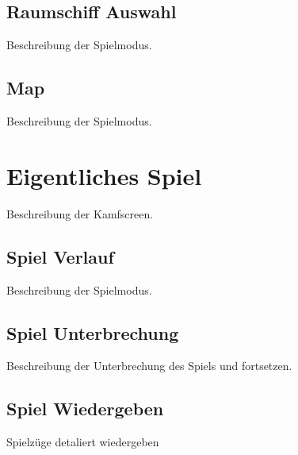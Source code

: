 \documentclass[fontsize=12pt,paper=a4,twoside]{scrartcl}
\begin{document}
\subsection{Raumschiff Auswahl}
Beschreibung der Spielmodus.
\subsection{Map}
Beschreibung der Spielmodus.

\section{Eigentliches Spiel}
Beschreibung der Kamfscreen.
\subsection{Spiel Verlauf}
Beschreibung der Spielmodus.

\subsection{Spiel Unterbrechung}
Beschreibung der Unterbrechung des Spiels und fortsetzen.


\subsection{Spiel Wiedergeben}
Spielzüge detaliert wiedergeben
\end{document}
